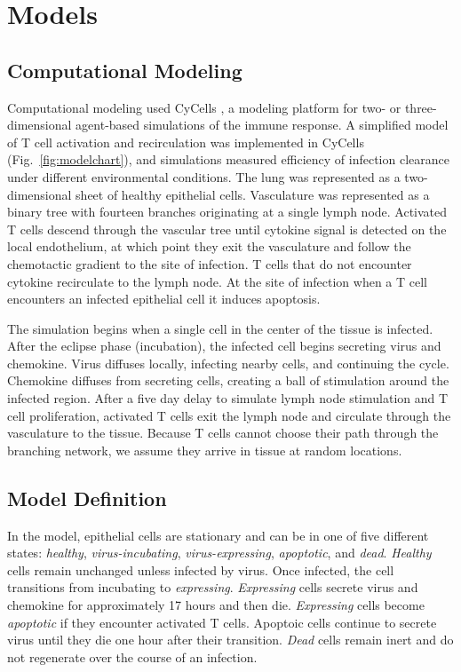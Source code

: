 \documentclass[10pt]{article}
\begin{document}
\section*{Models}


\subsection*{Computational Modeling}


Computational modeling used CyCells \cite{Warrender2006}, a modeling platform for two- or three-dimensional agent-based simulations of the immune response. A simplified model of T cell activation and recirculation was implemented in CyCells (Fig.~\ref{fig:modelchart}), and simulations measured efficiency of infection clearance under different environmental conditions. The lung was represented as a two-dimensional sheet of healthy epithelial cells. Vasculature was represented as a binary tree with fourteen branches originating at a single lymph node. Activated T cells descend through the vascular tree until cytokine signal is detected on the local endothelium, at which point they exit the vasculature and follow the chemotactic gradient to the site of infection. T cells that do not encounter cytokine recirculate to the lymph node. At the site of infection when a T cell encounters an infected epithelial cell it induces apoptosis.

The simulation begins when a single cell in the center of the tissue is infected. After the eclipse phase (incubation), the infected cell begins secreting virus and chemokine. Virus diffuses locally, infecting nearby cells, and continuing the cycle. Chemokine diffuses from secreting cells, creating a ball of stimulation around the infected region. After a five day delay to simulate lymph node stimulation and T cell proliferation, activated T cells exit the lymph node and circulate through the vasculature to the tissue. Because T  cells cannot choose their path through the branching network, we assume they arrive in tissue at random locations. 


\subsection*{Model Definition}

In the model, epithelial cells are stationary and can be in one of five different states: \emph{healthy}, \emph{virus-incubating}, \emph{virus-expressing}, \emph{apoptotic}, and \emph{dead}. \emph{Healthy} cells remain unchanged unless infected by virus. Once infected, the cell transitions from {incubating} to \emph{expressing}. \emph{Expressing} cells secrete virus and chemokine for approximately 17 hours and then die. \emph{Expressing} cells become \emph{apoptotic} if they encounter activated T cells. Apoptoic cells continue to secrete virus until they die one hour after their transition. \emph{Dead} cells remain inert and do not regenerate over the course of an infection.
\end{document}
